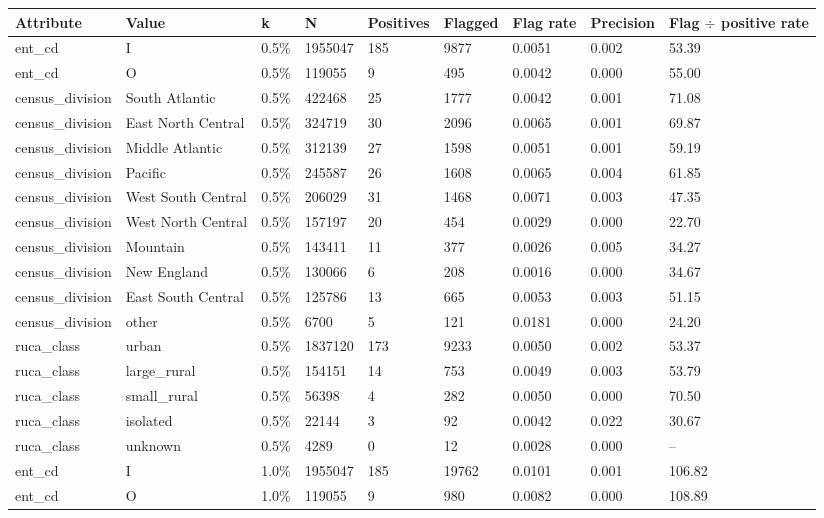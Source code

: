 \begin{tabular}{lllllllll}
\hline
Attribute & Value & k & N & Positives & Flagged & Flag rate & Precision & Flag $\div$ positive rate \\
\hline
ent\_cd & I & 0.5\% & 1955047 & 185 & 9877 & 0.0051 & 0.002 & 53.39 \\
ent\_cd & O & 0.5\% & 119055 & 9 & 495 & 0.0042 & 0.000 & 55.00 \\
census\_division & South Atlantic & 0.5\% & 422468 & 25 & 1777 & 0.0042 & 0.001 & 71.08 \\
census\_division & East North Central & 0.5\% & 324719 & 30 & 2096 & 0.0065 & 0.001 & 69.87 \\
census\_division & Middle Atlantic & 0.5\% & 312139 & 27 & 1598 & 0.0051 & 0.001 & 59.19 \\
census\_division & Pacific & 0.5\% & 245587 & 26 & 1608 & 0.0065 & 0.004 & 61.85 \\
census\_division & West South Central & 0.5\% & 206029 & 31 & 1468 & 0.0071 & 0.003 & 47.35 \\
census\_division & West North Central & 0.5\% & 157197 & 20 & 454 & 0.0029 & 0.000 & 22.70 \\
census\_division & Mountain & 0.5\% & 143411 & 11 & 377 & 0.0026 & 0.005 & 34.27 \\
census\_division & New England & 0.5\% & 130066 & 6 & 208 & 0.0016 & 0.000 & 34.67 \\
census\_division & East South Central & 0.5\% & 125786 & 13 & 665 & 0.0053 & 0.003 & 51.15 \\
census\_division & other & 0.5\% & 6700 & 5 & 121 & 0.0181 & 0.000 & 24.20 \\
ruca\_class & urban & 0.5\% & 1837120 & 173 & 9233 & 0.0050 & 0.002 & 53.37 \\
ruca\_class & large\_rural & 0.5\% & 154151 & 14 & 753 & 0.0049 & 0.003 & 53.79 \\
ruca\_class & small\_rural & 0.5\% & 56398 & 4 & 282 & 0.0050 & 0.000 & 70.50 \\
ruca\_class & isolated & 0.5\% & 22144 & 3 & 92 & 0.0042 & 0.022 & 30.67 \\
ruca\_class & unknown & 0.5\% & 4289 & 0 & 12 & 0.0028 & 0.000 & -- \\
ent\_cd & I & 1.0\% & 1955047 & 185 & 19762 & 0.0101 & 0.001 & 106.82 \\
ent\_cd & O & 1.0\% & 119055 & 9 & 980 & 0.0082 & 0.000 & 108.89 \\

\end{tabular}
